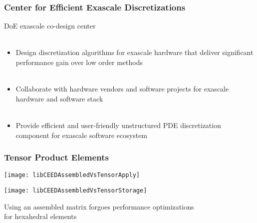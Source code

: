 \documentclass{beamer}
\begin{document}
\begin{frame}
\begin{center}
\frametitle{Center for Efficient Exascale Discretizations}

\begin{flushleft}
DoE exascale co-design center\\

~\\
\end{flushleft}

\begin{itemize}

\item Design discretization algorithms for exascale hardware that deliver significant performance gain over low order methods\\

~\\

\item Collaborate with hardware vendors and software projects for exascale hardware and software stack\\

~\\

\item Provide efficient and user-friendly unstructured PDE discretization component for exascale software ecosystem

\end{itemize}

\end{center}
\end{frame}


\begin{frame}
\begin{center}
\frametitle{Tensor Product Elements}

\setlength{\columnsep}{15mm}
\begin{multicols}{2}

\begin{flushright}
\texttt{[image: libCEEDAssembledVsTensorApply]}
\end{flushright}

\begin{flushleft}
\texttt{[image: libCEEDAssembledVsTensorStorage]}
\end{flushleft}

\end{multicols}

Using an assembled matrix forgoes performance optimizations\\
for hexahedral elements

\end{center}
\end{frame}
\end{document}

